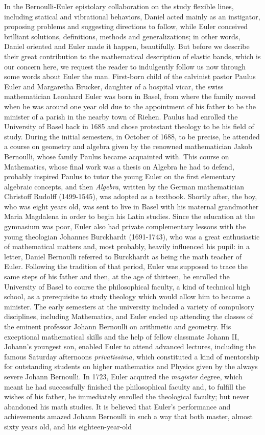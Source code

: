 In the Bernoulli-Euler epistolary collaboration on the study flexible lines, including statical and vibrational behaviors, Daniel acted mainly as an instigator, proposing problems and suggesting directions to follow, while Euler conceived brilliant solutions, definitions, methods and generalizations; in other words, Daniel oriented and Euler made it happen, beautifully. But before we describe their great contribution to the mathematical description of elastic bands, which is our concern here, we request the reader to indulgently follow us now through some words about Euler the man. First-born child of the calvinist pastor Paulus Euler and Margaretha Brucker, daughter of a hospital vicar, the swiss mathematician Leonhard Euler was born in Basel, from where the family moved when he was around one year old due to the appointment of his father to be the minister of a parish in the nearby town of Riehen. Paulus had enrolled the University of Basel back in 1685 and chose protestant theology to be his field of study. During the initial semesters, in October of 1688, to be precise, he attended a course on geometry and algebra given by the renowned mathematician Jakob Bernoulli, whose family Paulus became acquainted with. This course on Mathematics, whose final work was a thesis on Algebra he had to defend, probably inspired Paulus to tutor the young Euler on the first elementary algebraic concepts, and then \emph{Algebra}, written by the German mathematician Christoff Rudolff (1499-1545), was adopted as a textbook. Shortly after, the boy, who was eight years old, was sent to live in Basel with his maternal grandmother Maria Magdalena in order to begin his Latin studies. Since the education at the gymnasium was poor, Euler also had private complementary lessons with the young theologian Johannes Burckhardt (1691-1743), who was a great enthusiastic of mathematical matters and, most probably, heavily influenced his pupil: in a letter, Daniel Bernoulli referred to Burckhardt as being the math teacher of Euler. Following the tradition of that period, Euler was supposed to trace the same steps of his father and then, at the age of thirteen, he enrolled the University of Basel to course the philosophical faculty, a kind of technical high school, as a prerequisite to study theology which would allow him to become a minister. The early semesters at the university included a variety of compulsory disciplines, including Mathematics, and Euler ended up attending the classes of the eminent professor Johann Bernoulli on arithmetic and geometry. His exceptional mathematical skills and the help of fellow classmate Johann II, Johann's youngest son, enabled Euler to attend advanced lectures, including the famous Saturday afternoons \emph{privatissima}, which constituted a kind of mentorship for outstanding students on higher mathematics and Physics given by the always severe Johann Bernoulli. In 1723, Euler acquired the \emph{magister} degree, which meant he had successfully finished the philosophical faculty and, to fulfill the wishes of his father, he immediately enrolled the theological faculty; but never abandoned his math studies. It is believed that Euler's performance and achievements amazed Johann Bernoulli in such a way that both master, almost sixty years old, and his eighteen-year-old 